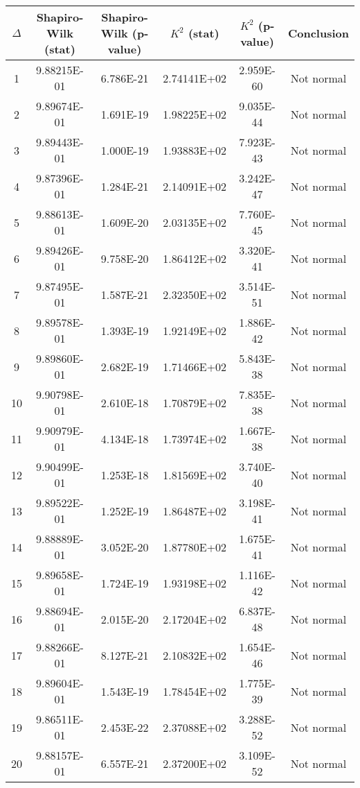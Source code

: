 \begin{table}[h]
	\begin{tabular}{|c|c|c|c|c|c|}
		\hline
		$\Delta$ &  Shapiro-Wilk (stat) & Shapiro-Wilk (p-value) & $K^2$ (stat) & $K^2$ (p-value) & Conclusion\\\hline
		\hline
		1 & 9.88215E-01 & 6.786E-21 & 2.74141E+02 & 2.959E-60 & Not normal\\\hline
		2 & 9.89674E-01 & 1.691E-19 & 1.98225E+02 & 9.035E-44 & Not normal\\\hline
		3 & 9.89443E-01 & 1.000E-19 & 1.93883E+02 & 7.923E-43 & Not normal\\\hline
		4 & 9.87396E-01 & 1.284E-21 & 2.14091E+02 & 3.242E-47 & Not normal\\\hline
		5 & 9.88613E-01 & 1.609E-20 & 2.03135E+02 & 7.760E-45 & Not normal\\\hline
		6 & 9.89426E-01 & 9.758E-20 & 1.86412E+02 & 3.320E-41 & Not normal\\\hline
		7 & 9.87495E-01 & 1.587E-21 & 2.32350E+02 & 3.514E-51 & Not normal\\\hline
		8 & 9.89578E-01 & 1.393E-19 & 1.92149E+02 & 1.886E-42 & Not normal\\\hline
		9 & 9.89860E-01 & 2.682E-19 & 1.71466E+02 & 5.843E-38 & Not normal\\\hline
		10 & 9.90798E-01 & 2.610E-18 & 1.70879E+02 & 7.835E-38 & Not normal\\\hline
		11 & 9.90979E-01 & 4.134E-18 & 1.73974E+02 & 1.667E-38 & Not normal\\\hline
		12 & 9.90499E-01 & 1.253E-18 & 1.81569E+02 & 3.740E-40 & Not normal\\\hline
		13 & 9.89522E-01 & 1.252E-19 & 1.86487E+02 & 3.198E-41 & Not normal\\\hline
		14 & 9.88889E-01 & 3.052E-20 & 1.87780E+02 & 1.675E-41 & Not normal\\\hline
		15 & 9.89658E-01 & 1.724E-19 & 1.93198E+02 & 1.116E-42 & Not normal\\\hline
		16 & 9.88694E-01 & 2.015E-20 & 2.17204E+02 & 6.837E-48 & Not normal\\\hline
		17 & 9.88266E-01 & 8.127E-21 & 2.10832E+02 & 1.654E-46 & Not normal\\\hline
		18 & 9.89604E-01 & 1.543E-19 & 1.78454E+02 & 1.775E-39 & Not normal\\\hline
		19 & 9.86511E-01 & 2.453E-22 & 2.37088E+02 & 3.288E-52 & Not normal\\\hline
		20 & 9.88157E-01 & 6.557E-21 & 2.37200E+02 & 3.109E-52 & Not normal\\\hline

\end{tabular}
\end{table}
